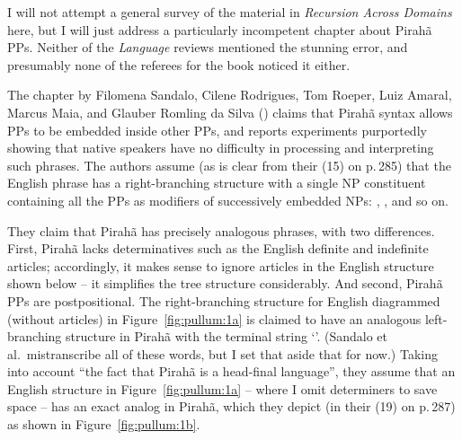 \documentclass[output=paper,colorlinks,citecolor=brown
]{langscibook}
\begin{document}
I will not attempt a general survey of the material in
\textit{Recursion Across Domains} here, but I will just address a
particularly incompetent chapter about Pirah{\~a} PPs. Neither of
the \textit{Language} reviews mentioned the stunning error, and
presumably none of the referees for the book noticed it either.

The chapter by Filomena Sandalo, Cilene Rodrigues, Tom Roeper, Luiz Amaral,
Marcus Maia, and Glauber Romling da Silva (\citeyear{SandaloEtAl18})
claims that Pirah{\~a} syntax allows PPs to be embedded inside other PPs,
and reports experiments purportedly showing that native speakers have no
difficulty in processing and interpreting such phrases. The authors assume
(as is clear from their (15) on p.\,285) that the English phrase
 has a
right-branching structure with a single NP constituent containing
all the PPs as modifiers of successively embedded NPs:
,
, and so on.

They claim that Pirah{\~a} has precisely analogous phrases, with two
differences. First, Pirah{\~a} lacks determinatives such as the English
definite and indefinite articles; accordingly, it makes sense to ignore
articles in the English structure shown below -- it simplifies the tree
structure considerably.  And second, Pirah{\~a} PPs are postpositional.
The right-branching structure for English diagrammed (without articles)
in Figure~\ref{fig:pullum:1a} is claimed to have an analogous left-branching structure in
Pirah{\~a} with the terminal string `'. (Sandalo et al.\ mistranscribe all of these
words, but I set that aside that for now.) Taking into account ``the
fact that Pirah{\~a} is a head-final language'', they assume that an
English structure in Figure~\ref{fig:pullum:1a} -- where I omit determiners to save space
-- has an exact analog in Pirah{\~a}, which they depict
(in their (19) on p.\,287) as shown in Figure~\ref{fig:pullum:1b}.
\end{document}
